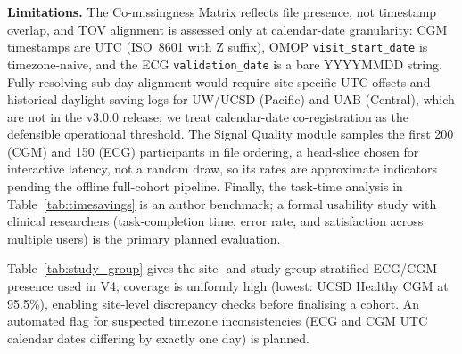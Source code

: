 \documentclass[conference]{IEEEtran}
\begin{document}
\textbf{Limitations.} The Co-missingness Matrix reflects file presence, not timestamp overlap, and TOV alignment is assessed only at calendar-date granularity: CGM timestamps are UTC (ISO~8601 with Z suffix), OMOP \texttt{visit\_start\_date} is timezone-naive, and the ECG \texttt{validation\_date} is a bare YYYYMMDD string. Fully resolving sub-day alignment would require site-specific UTC offsets and historical daylight-saving logs for UW/UCSD (Pacific) and UAB (Central), which are not in the v3.0.0 release; we treat calendar-date co-registration as the defensible operational threshold. The Signal Quality module samples the first 200 (CGM) and 150 (ECG) participants in file ordering, a head-slice chosen for interactive latency, not a random draw, so its rates are approximate indicators pending the offline full-cohort pipeline. Finally, the task-time analysis in Table~\ref{tab:timesavings} is an author benchmark; a formal usability study with clinical researchers (task-completion time, error rate, and satisfaction across multiple users) is the primary planned evaluation.

Table~\ref{tab:study_group} gives the site- and study-group-stratified ECG/CGM presence used in V4; coverage is uniformly high (lowest: UCSD Healthy CGM at 95.5\%), enabling site-level discrepancy checks before finalising a cohort. An automated flag for suspected timezone inconsistencies (ECG and CGM UTC calendar dates differing by exactly one day) is planned.
\end{document}
